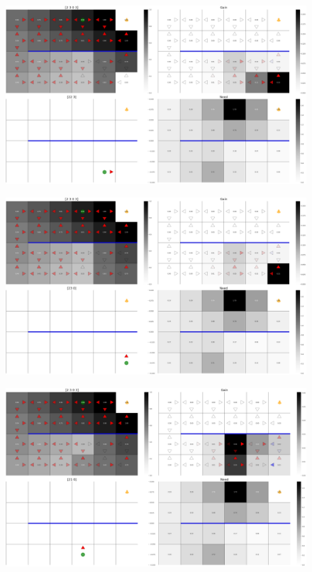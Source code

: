 \documentclass{article}
\begin{document}
\begin{figure}[ht!]
    \centering
    \includegraphics[width=1\textwidth]{../../../data/plots/move_3001_2.png}
\end{figure}
\begin{figure}[ht!]
    \centering
    \includegraphics[width=1\textwidth]{../../../data/plots/move_3001_3.png}
\end{figure}
\begin{figure}[ht!]
    \centering
    \includegraphics[width=1\textwidth]{../../../data/plots/move_3001_4.png}
\end{figure}
\end{document}
